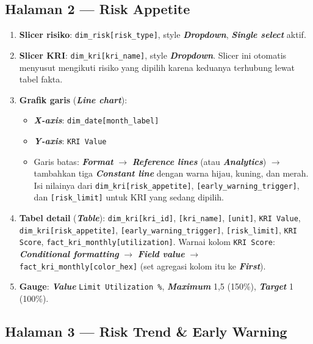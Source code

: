\documentclass[11pt,a4paper]{article}
\newcommand{\file}[1]{\texttt{\small #1}}
\newcommand{\ui}[1]{\textbf{\textit{#1}}}
\begin{document}
\subsection{Halaman 2 --- Risk Appetite}

\begin{enumerate}
\item \textbf{Slicer risiko}: \file{dim\_risk[risk\_type]}, style \ui{Dropdown}, \ui{Single select} aktif.
\item \textbf{Slicer KRI}: \file{dim\_kri[kri\_name]}, style \ui{Dropdown}. Slicer ini otomatis menyusut mengikuti risiko yang dipilih karena keduanya terhubung lewat tabel fakta.
\item \textbf{Grafik garis} (\ui{Line chart}):
  \begin{itemize}
  \item \ui{X-axis}: \file{dim\_date[month\_label]}
  \item \ui{Y-axis}: \file{KRI Value}
  \item Garis batas: \ui{Format} $\rightarrow$ \ui{Reference lines} (atau \ui{Analytics}) $\rightarrow$ tambahkan tiga \ui{Constant line} dengan warna hijau, kuning, dan merah. Isi nilainya dari \file{dim\_kri[risk\_appetite]}, \file{[early\_warning\_trigger]}, dan \file{[risk\_limit]} untuk KRI yang sedang dipilih.
  \end{itemize}
\item \textbf{Tabel detail} (\ui{Table}): \file{dim\_kri[kri\_id]}, \file{[kri\_name]}, \file{[unit]}, \file{KRI Value}, \file{dim\_kri[risk\_appetite]}, \file{[early\_warning\_trigger]}, \file{[risk\_limit]}, \file{KRI Score}, \file{fact\_kri\_monthly[utilization]}.
  Warnai kolom \file{KRI Score}: \ui{Conditional formatting} $\rightarrow$ \ui{Field value} $\rightarrow$ \file{fact\_kri\_monthly[color\_hex]} (set agregasi kolom itu ke \ui{First}).
\item \textbf{Gauge}: \ui{Value} \file{Limit Utilization \%}, \ui{Maximum} 1,5 (150\%), \ui{Target} 1 (100\%).
\end{enumerate}

\subsection{Halaman 3 --- Risk Trend \& Early Warning}
\end{document}
